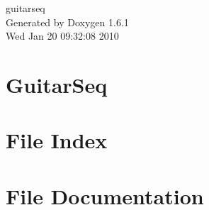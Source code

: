\documentclass[a4paper]{book}
\begin{document}
\hypersetup{pageanchor=false}
\begin{titlepage}
\vspace*{7cm}
\begin{center}
{\Large guitarseq }\\
\vspace*{1cm}
{\large Generated by Doxygen 1.6.1}\\
\vspace*{0.5cm}
{\small Wed Jan 20 09:32:08 2010}\\
\end{center}
\end{titlepage}
\clearemptydoublepage
{}
\tableofcontents
\clearemptydoublepage
{}
\hypersetup{pageanchor=true}
\chapter{GuitarSeq}
\label{index}\hypertarget{index}{}
\chapter{File Index}

\chapter{File Documentation}















\printindex
\end{document}
